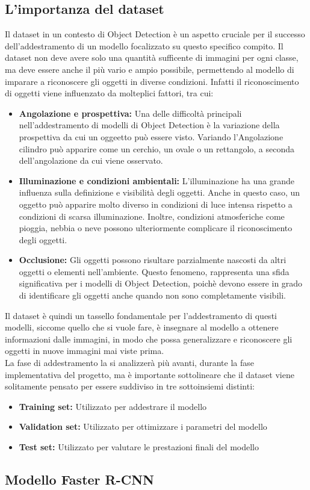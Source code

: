 \subsection{L'importanza del dataset}
Il dataset in un contesto di Object Detection è un aspetto cruciale per il successo
dell'addestramento di un modello focalizzato su questo specifico compito.
Il dataset non deve avere solo una quantità sufficente di immagini per ogni classe,
ma deve essere anche il più vario e ampio possibile, permettendo al modello di
imparare a riconoscere gli oggetti in diverse condizioni.
Infatti il riconoscimento di oggetti viene influenzato da molteplici fattori, tra cui:

\begin{itemize}
    \item \textbf{Angolazione e prospettiva:} Una delle difficoltà 
    principali nell'addestramento di modelli di Object Detection è la variazione
    della prospettiva da cui un oggeetto può essere visto. Variando l'Angolazione
    cilindro può apparire come un cerchio, un ovale o un rettangolo, a seconda
    dell'angolazione da cui viene osservato.

    \item \textbf{Illuminazione e condizioni ambientali:} L'illuminazione ha una grande
    influenza sulla definizione e visibilità degli oggetti. Anche in questo caso,
    un oggetto può apparire molto diverso in condizioni di luce intensa rispetto
    a condizioni di scarsa illuminazione. Inoltre, condizioni atmosferiche come
    pioggia, nebbia o neve possono ulteriormente complicare il riconoscimento
    degli oggetti.

    \item \textbf{Occlusione:} Gli oggetti possono risultare parzialmente nascosti da altri oggetti
    o elementi nell'ambiente. Questo fenomeno,  rappresenta una  sfida significativa
    per i modelli di Object Detection, poichè devono essere in grado di identificare
    gli oggetti anche quando non sono completamente visibili.

\end{itemize}

Il dataset è quindi un tassello fondamentale per l'addestramento di questi modelli,
siccome quello che si vuole fare, è insegnare al modello a ottenere informazioni dalle
immagini, in modo che possa generalizzare e riconoscere gli oggetti in nuove immagini
mai viste prima.\\

La fase di addestramento la si analizzerà più avanti, durante la fase implementativa del progetto,
ma è importante sottolineare che il dataset viene solitamente pensato per essere suddiviso in tre sottoinsiemi distinti:
\begin{itemize}
    \item \textbf{Training set:} Utilizzato per addestrare il modello
    \item   \textbf{Validation set:} Utilizzato per ottimizzare i parametri del modello
    \item \textbf{Test set:} Utilizzato per valutare le prestazioni finali del modello
\end{itemize}

\subsection{Modello Faster R-CNN}


